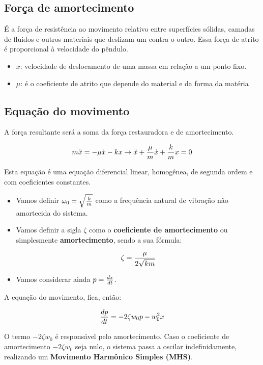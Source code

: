 \subsection{Força de amortecimento}
É a força de resistência ao movimento relativo entre superfícies sólidas, camadas de fluidos e outros materiais que deslizam um contra o outro. Essa força de atrito é proporcional à velocidade do pêndulo.
\begin{itemize}
\item $\dot{x}$:  velocidade de deslocamento de uma massa em relação a um ponto fixo.
\item $\mu$: é o coeficiente de atrito que depende do material e da forma da matéria
\end{itemize}

\subsection{Equação do movimento}

A força resultante será a soma da força restauradora e de amortecimento.

\[\large m \ddot{x} = -\mu \dot{x} -kx \rightarrow \ddot{x} + \frac{\mu}{m}\dot{x} + \frac{k}{m}x = 0\]
	
Esta equação é uma equação diferencial linear, homogênea, de segunda ordem e com coeficientes constantes. 

\begin{itemize}

\item Vamos definir $\large \omega _{0} = \sqrt{\frac{k}{m}}$ como a frequência natural de vibração não amortecida do sistema.

\item Vamos definir a sigla $\zeta$ como o \textbf{coeficiente de amortecimento} ou simplesmente \textbf{amortecimento}, sendo a sua fórmula:

\[ \large \zeta = \frac{\mu}{2\sqrt{km}} \]

\item Vamos considerar ainda $\large p = \frac{dx}{dt}$.

\end{itemize}

A equação do movimento, fica, então:

\[ \large \frac{dp}{dt} = -2\zeta w_{0} p - w_{0}^2x \]

O termo $-2\zeta w_{0}$ é responsável pelo amortecimento. Caso o coeficiente de amortecimento $-2\zeta w_{0}$ seja nulo, o sistema passa a oscilar indefinidamente, realizando um \textbf{Movimento Harmônico Simples (MHS)}.

